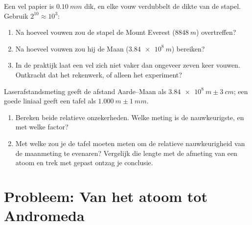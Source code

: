\begin{exercise}[$\star\star\star$]\label{exo:g10:orders-of-magnitude:14}
Een vel papier is $\qty{0.10}{mm}$ dik, en elke vouw verdubbelt de
dikte van de stapel. Gebruik $2^{10} \approx 10^{3}$:
\begin{enumerate}
  \item Na hoeveel vouwen zou de stapel de Mount Everest
        ($\qty{8848}{m}$) overtreffen?
  \item Na hoeveel vouwen zou hij de Maan ($\qty{3.84e8}{m}$) bereiken?
  \item In de praktijk laat een vel zich niet vaker dan ongeveer zeven
        keer vouwen. Ontkracht dat het rekenwerk, of alleen het
        experiment?
\end{enumerate}
\end{exercise}

\begin{exercise}[$\star\star\star$]\label{exo:g10:orders-of-magnitude:15}
Laserafstandsmeting geeft de afstand Aarde--Maan als
$\qty{3.84e8}{m} \pm \qty{3}{cm}$; een goede liniaal geeft een tafel
als $\qty{1.000}{m} \pm \qty{1}{mm}$.
\begin{enumerate}
  \item Bereken beide relatieve onzekerheden. Welke meting is de
        nauwkeurigste, en met welke factor?
  \item Met welke  zou je de tafel moeten meten om
        de relatieve nauwkeurigheid van de maanmeting te evenaren?
        Vergelijk die lengte met de afmeting van een atoom en trek met
        gepast ontzag je conclusie.
\end{enumerate}
\end{exercise}

\section{Probleem: Van het atoom tot Andromeda}

